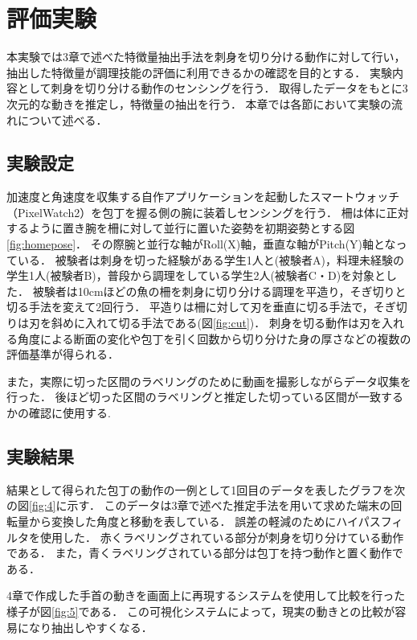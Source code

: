 \chapter{評価実験}
本実験では3章で述べた特徴量抽出手法を刺身を切り分ける動作に対して行い，抽出した特徴量が調理技能の評価に利用できるかの確認を目的とする．
実験内容として刺身を切り分ける動作のセンシングを行う．
取得したデータをもとに3次元的な動きを推定し，特徴量の抽出を行う．
本章では各節において実験の流れについて述べる．
\section{実験設定}
加速度と角速度を収集する自作アプリケーションを起動したスマートウォッチ（PixelWatch2）を包丁を握る側の腕に装着しセンシングを行う．
柵は体に正対するように置き腕を柵に対して並行に置いた姿勢を初期姿勢とする図\ref{fig:homepose}．
その際腕と並行な軸がRoll(X)軸，垂直な軸がPitch(Y)軸となっている．
被験者は刺身を切った経験がある学生1人と(被験者A)，料理未経験の学生1人(被験者B)，普段から調理をしている学生2人(被験者C・D)を対象とした．
被験者は10cmほどの魚の柵を刺身に切り分ける調理を平造り，そぎ切りと切る手法を変えて2回行う．
平造りは柵に対して刃を垂直に切る手法で，そぎ切りは刃を斜めに入れて切る手法である(図\ref{fig:cut})．
刺身を切る動作は刃を入れる角度による断面の変化や包丁を引く回数から切り分けた身の厚さなどの複数の評価基準が得られる．

また，実際に切った区間のラベリングのために動画を撮影しながらデータ収集を行った．
後ほど切った区間のラベリングと推定した切っている区間が一致するかの確認に使用する.
\section{実験結果}
結果として得られた包丁の動作の一例として1回目のデータを表したグラフを次の図\ref{fig:4}に示す．
このデータは3章で述べた推定手法を用いて求めた端末の回転量から変換した角度と移動を表している．
誤差の軽減のためにハイパスフィルタを使用した．
赤くラベリングされている部分が刺身を切り分けている動作である．
また，青くラベリングされている部分は包丁を持つ動作と置く動作である．

4章で作成した手首の動きを画面上に再現するシステムを使用して比較を行った様子が図\ref{fig:5}である．
この可視化システムによって，現実の動きとの比較が容易になり抽出しやすくなる．

